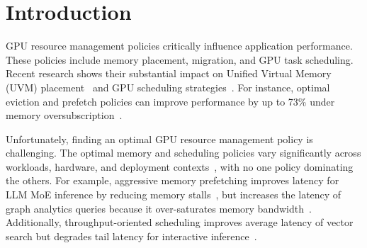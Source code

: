 \section{Introduction}

GPU resource management policies critically influence application performance.
These policies include memory placement, migration, and GPU task scheduling.
Recent research shows their substantial impact on Unified Virtual Memory (UVM) placement~\cite{wang2024suv,lin2025forest,kim2025dream,park2025helm} and GPU scheduling strategies~\cite{wang2024gcaps,fan2025gpreempt,shen2025xsched}.
For instance, optimal eviction and prefetch policies can improve performance by up to 73\% under memory oversubscription~\cite{park2025helm,kehne2019etc,ganguly2019interplay}.

Unfortunately, finding an optimal GPU resource management policy is challenging.
The optimal memory and scheduling policies vary significantly across workloads, hardware, and deployment contexts~\cite{kwon2023efficient,agrawal2024taming,lin2024towards,wang2016gunrock,shoeybi2019megatron,rasley2020deepspeed,pan2024survey,cao2023gpu}, with no one policy dominating the others.
For example, aggressive memory prefetching improves latency for LLM MoE inference by reducing memory stalls~\cite{park2025helm,ganguly2019interplay}, but increases the latency of graph analytics queries because it over-saturates memory bandwidth~\cite{ganguly2019interplay}.
Additionally, throughput-oriented scheduling improves average latency of vector search but degrades tail latency for interactive inference~\cite{agrawal2024taming,fan2025gpreempt}.

